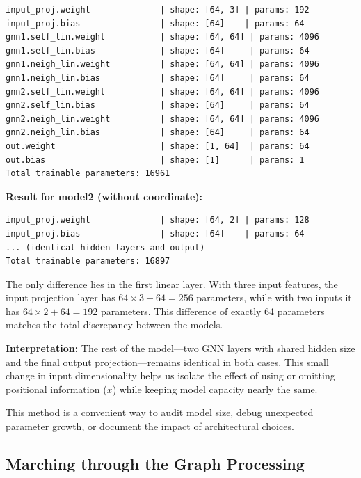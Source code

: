 \begin{verbatim}
input_proj.weight              | shape: [64, 3] | params: 192
input_proj.bias                | shape: [64]    | params: 64
gnn1.self_lin.weight           | shape: [64, 64] | params: 4096
gnn1.self_lin.bias             | shape: [64]     | params: 64
gnn1.neigh_lin.weight          | shape: [64, 64] | params: 4096
gnn1.neigh_lin.bias            | shape: [64]     | params: 64
gnn2.self_lin.weight           | shape: [64, 64] | params: 4096
gnn2.self_lin.bias             | shape: [64]     | params: 64
gnn2.neigh_lin.weight          | shape: [64, 64] | params: 4096
gnn2.neigh_lin.bias            | shape: [64]     | params: 64
out.weight                     | shape: [1, 64]  | params: 64
out.bias                       | shape: [1]      | params: 1
Total trainable parameters: 16961
\end{verbatim}

\vspace{1em}
{\bf Result for model2 (without coordinate):}

\begin{verbatim}
input_proj.weight              | shape: [64, 2] | params: 128
input_proj.bias                | shape: [64]    | params: 64
... (identical hidden layers and output)
Total trainable parameters: 16897
\end{verbatim}

The only difference lies in the first linear layer. With three input features, the input projection layer has $64 \times 3 + 64 = 256$ parameters, while with two inputs it has $64 \times 2 + 64 = 192$ parameters. This difference of exactly 64 parameters matches the total discrepancy between the models.

\vspace{1em}
{\bf Interpretation:} The rest of the model—two GNN layers with shared hidden size and the final output projection—remains identical in both cases. This small change in input dimensionality helps us isolate the effect of using or omitting positional information ($x$) while keeping model capacity nearly the same.

This method is a convenient way to audit model size, debug unexpected parameter growth, or document the impact of architectural choices.

%
\subsection{Marching through the Graph Processing}

